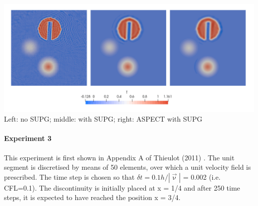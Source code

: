 \begin{center}
\includegraphics[width=15cm]{python_codes/fieldstone_43/results/experiment2/Temps}\\
{\captionfont Left: no SUPG; middle: with SUPG; right: ASPECT with SUPG}
\end{center}


\newpage
\paragraph{Experiment 3}

This experiment is first shown in Appendix A of Thieulot (2011) \cite{thie11}.
The unit segment is discretised by means of 50 elements, 
over which a unit velocity field is prescribed. The time step
is chosen so that $\delta t = 0.1 h/|\vec\upnu|$ = 0.002 (i.e. CFL=0.1). 
The discontinuity is initially
placed at x = 1/4 and after 250 time steps, it is expected to have
reached the position x = 3/4.


